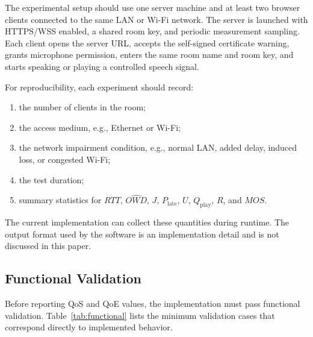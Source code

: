 \documentclass[conference]{IEEEtran}
\begin{document}
The experimental setup should use one server machine and at least two browser clients connected to the same LAN or Wi-Fi network. The server is launched with HTTPS/WSS enabled, a shared room key, and periodic measurement sampling. Each client opens the server URL, accepts the self-signed certificate warning, grants microphone permission, enters the same room name and room key, and starts speaking or playing a controlled speech signal.

For reproducibility, each experiment should record:
\begin{enumerate}
    \item the number of clients in the room;
    \item the access medium, e.g., Ethernet or Wi-Fi;
    \item the network impairment condition, e.g., normal LAN, added delay, induced loss, or congested Wi-Fi;
    \item the test duration;
    \item summary statistics for $RTT$, $\widehat{OWD}$, $J$, $P_{\mathrm{late}}$, $U$, $Q_{\mathrm{play}}$, $R$, and $MOS$.
\end{enumerate}

The current implementation can collect these quantities during runtime. The output format used by the software is an implementation detail and is not discussed in this paper.

\subsection{Functional Validation}

Before reporting QoS and QoE values, the implementation must pass functional validation. Table~\ref{tab:functional} lists the minimum validation cases that correspond directly to implemented behavior.
\end{document}
